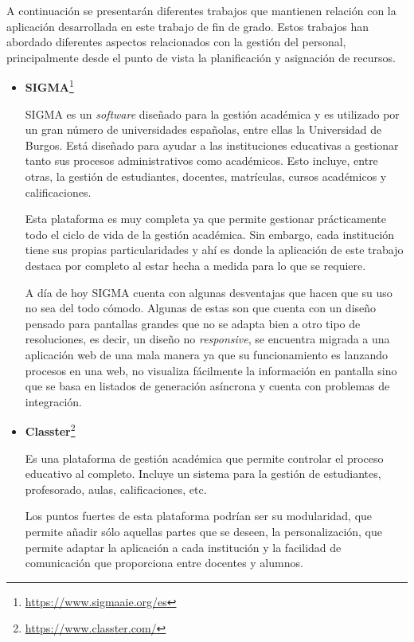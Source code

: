 
A continuación se presentarán diferentes trabajos que mantienen relación con la aplicación desarrollada en este trabajo de fin de grado.
Estos trabajos han abordado diferentes aspectos relacionados con la gestión del personal, principalmente desde el punto de vista la planificación y asignación de recursos.

\begin{itemize}
\item \textbf{SIGMA}\footnote{\url{https://www.sigmaaie.org/es}}

SIGMA es un \textit{software} diseñado para la gestión académica y es utilizado por un gran número de universidades españolas, entre ellas la Universidad de Burgos.
Está diseñado para ayudar a las instituciones educativas a gestionar tanto sus procesos administrativos como académicos.
Esto incluye, entre otras, la gestión de estudiantes, docentes, matrículas, cursos académicos y calificaciones.

Esta plataforma es muy completa ya que permite gestionar prácticamente todo el ciclo de vida de la gestión académica. Sin embargo, cada institución tiene sus propias particularidades y ahí es donde la aplicación de este trabajo destaca por completo al estar hecha a medida para lo que se requiere.

A día de hoy SIGMA cuenta con algunas desventajas que hacen que su uso no sea del todo cómodo.
Algunas de estas son que cuenta con un diseño pensado para pantallas grandes que no se adapta bien a otro tipo de resoluciones, es decir, un diseño no \textit{responsive}, se encuentra migrada a una aplicación web de una mala manera ya que su funcionamiento es lanzando procesos en una web, no visualiza fácilmente la información en pantalla sino que se basa en listados de generación asíncrona y cuenta con problemas de integración.

\item \textbf{Classter}\footnote{\url{https://www.classter.com/}}

Es una plataforma de gestión académica que permite controlar el proceso educativo al completo.
Incluye un sistema para la gestión de estudiantes, profesorado, aulas, calificaciones, etc.

Los puntos fuertes de esta plataforma podrían ser su modularidad, que permite añadir sólo aquellas partes que se deseen, la personalización, que permite adaptar la aplicación a cada institución y la facilidad de comunicación que proporciona entre docentes y alumnos.


\end{itemize}
